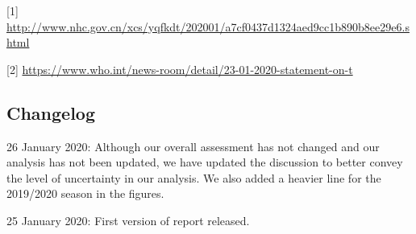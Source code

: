 \documentclass[]{article}
\begin{document}
{[}1{]}
\url{http://www.nhc.gov.cn/xcs/yqfkdt/202001/a7cf0437d1324aed9cc1b890b8ee29e6.shtml}

{[}2{]}
\url{https://www.who.int/news-room/detail/23-01-2020-statement-on-t}

\hypertarget{changelog}{%
\subsection{Changelog}\label{changelog}}

26 January 2020: Although our overall assessment has not changed and our
analysis has not been updated, we have updated the discussion to better
convey the level of uncertainty in our analysis. We also added a heavier
line for the 2019/2020 season in the figures.

25 January 2020: First version of report released.
\end{document}
